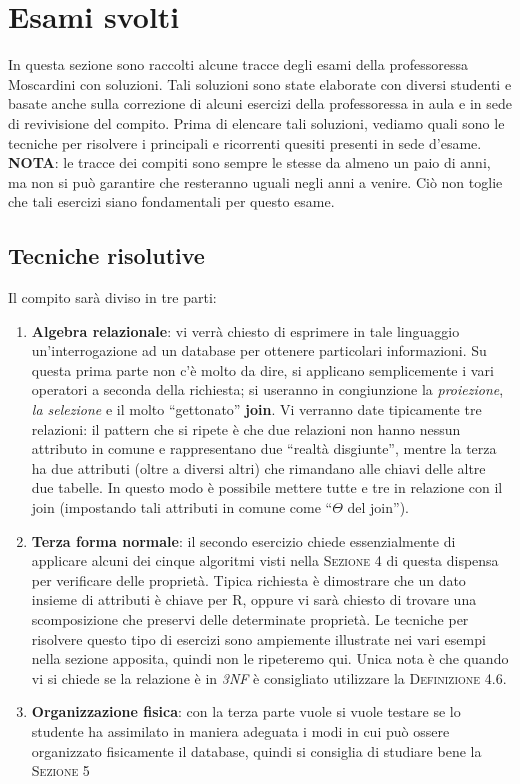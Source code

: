 \section{Esami svolti}
In questa sezione sono raccolti alcune tracce degli esami della professoressa
Moscardini con soluzioni. Tali soluzioni sono state elaborate con diversi studenti
e basate anche sulla correzione di alcuni esercizi della professoressa in aula e 
in sede di revivisione del compito. Prima di elencare tali soluzioni, vediamo quali
sono le tecniche per risolvere i principali e ricorrenti quesiti presenti in sede d'esame.\\
\textbf{NOTA}: le tracce dei compiti sono sempre le stesse da almeno un paio di anni, ma non
si può garantire che resteranno uguali negli anni a venire. Ciò non toglie che tali esercizi 
siano fondamentali per questo esame.
\subsection{Tecniche risolutive}
Il compito sarà diviso in tre parti:
\begin{enumerate}
 \item \textbf {Algebra relazionale}: vi verrà chiesto di esprimere in tale linguaggio
 un'interrogazione ad un database per ottenere particolari informazioni. Su questa prima parte
 non c'è molto da dire, si applicano semplicemente i vari operatori a seconda della richiesta; si useranno in 
 congiunzione la \emph{proiezione}, \emph{la selezione} e il molto 
 ``gettonato'' \textbf{join}. Vi verranno date tipicamente tre relazioni: il pattern che si ripete
 è che due relazioni non hanno nessun attributo in comune e rappresentano due ``realtà disgiunte'', mentre la terza
 ha due attributi (oltre a diversi altri) che rimandano alle chiavi delle altre due tabelle. In questo modo è possibile 
 mettere tutte e tre in relazione con il join (impostando tali attributi in comune come ``$\Theta$ del join'').
 \item \textbf {Terza forma normale}: il secondo esercizio chiede essenzialmente di applicare alcuni dei cinque
 algoritmi visti nella \textsc{Sezione 4} di questa dispensa per verificare delle proprietà. Tipica richiesta
 è dimostrare che un dato insieme di attributi è chiave per R, oppure vi sarà chiesto di trovare una scomposizione
 che preservi delle determinate proprietà. Le tecniche per risolvere questo tipo di esercizi sono ampiemente illustrate nei vari
 esempi nella sezione apposita, quindi non le ripeteremo qui. Unica nota è che quando vi si chiede se la relazione è in \emph{3NF}
 è consigliato utilizzare la \textsc{Definizione 4.6}.
 \item \textbf{Organizzazione fisica}: con la terza parte vuole si vuole testare se lo studente ha assimilato 
 in maniera adeguata i modi in cui può ossere organizzato fisicamente il database, quindi si consiglia di studiare bene la \textsc{Sezione 5}
\end{enumerate}

